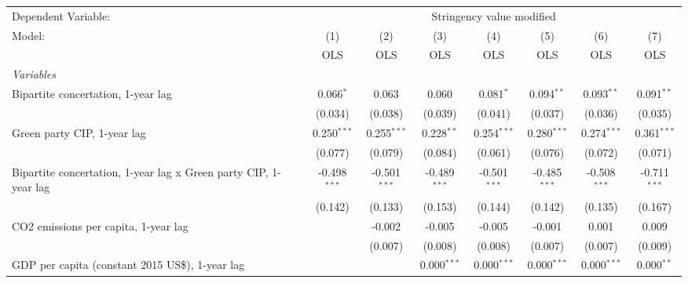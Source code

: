 
\begingroup
\centering
\begin{tabular}{lccccccc}
   \toprule
   Dependent Variable: & \multicolumn{7}{c}{Stringency value modified}\\
   Model:                                                           & (1)            & (2)            & (3)            & (4)            & (5)            & (6)            & (7)\\  
                                                                    &  OLS           & OLS            & OLS            & OLS            & OLS            & OLS            & OLS\\  
   \midrule
   \emph{Variables}\\
   Bipartite concertation, 1-year lag                               & 0.066$^{*}$    & 0.063          & 0.060          & 0.081$^{*}$    & 0.094$^{**}$   & 0.093$^{**}$   & 0.091$^{**}$\\   
                                                                    & (0.034)        & (0.038)        & (0.039)        & (0.041)        & (0.037)        & (0.036)        & (0.035)\\   
   Green party CIP, 1-year lag                                      & 0.250$^{***}$  & 0.255$^{***}$  & 0.228$^{**}$   & 0.254$^{***}$  & 0.280$^{***}$  & 0.274$^{***}$  & 0.361$^{***}$\\   
                                                                    & (0.077)        & (0.079)        & (0.084)        & (0.061)        & (0.076)        & (0.072)        & (0.071)\\   
   Bipartite concertation, 1-year lag x Green party CIP, 1-year lag & -0.498$^{***}$ & -0.501$^{***}$ & -0.489$^{***}$ & -0.501$^{***}$ & -0.485$^{***}$ & -0.508$^{***}$ & -0.711$^{***}$\\   
                                                                    & (0.142)        & (0.133)        & (0.153)        & (0.144)        & (0.142)        & (0.135)        & (0.167)\\   
   CO2 emissions per capita, 1-year lag                             &                & -0.002         & -0.005         & -0.005         & -0.001         & 0.001          & 0.009\\   
                                                                    &                & (0.007)        & (0.008)        & (0.008)        & (0.007)        & (0.007)        & (0.009)\\   
   GDP per capita (constant 2015 US\$), 1-year lag                  &                &                & 0.000$^{***}$  & 0.000$^{***}$  & 0.000$^{***}$  & 0.000$^{***}$  & 0.000$^{**}$\\   

\end{tabular}
